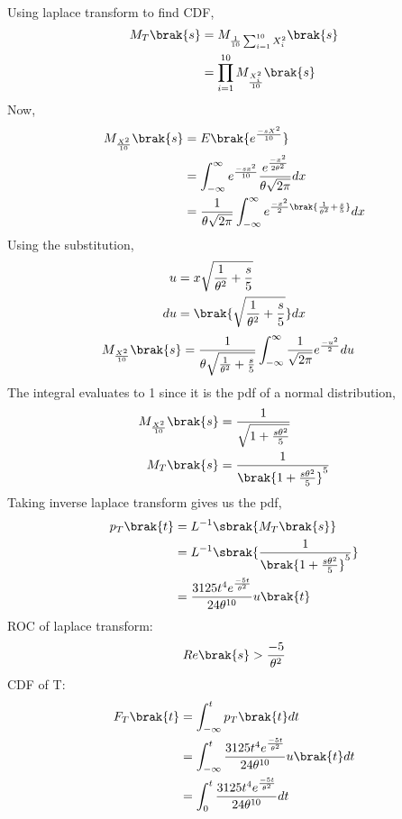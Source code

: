 \documentclass[journal,12pt,onecolumn]{IEEEtran}
\theoremstyle{remark}
\begin{document}
\\
Using laplace transform to find CDF,
\begin{align}
	M_T\brak{s} &= M_{\frac{1}{10}\sum^{10}_{i=1}{X^2_i}}\brak{s}\\
	&= \prod^{10}_{i=1}{M_{\frac{X_i^2}{10}}\brak{s}}
\end{align}
Now,
\begin{align}
	M_{\frac{X^2}{10}}\brak{s} &= E\brak{e^{\frac{-sX^2}{10}}}\\
	&= \int^{\infty}_{-\infty}{e^{\frac{-sx^2}{10}}\frac{e^{\frac{-x^2}{2\theta^2}}}{\theta\sqrt{2\pi}}dx}\\
	&= \frac{1}{\theta\sqrt{2\pi}}\int^{\infty}_{-\infty}{e^{\frac{-x^2}{2}\brak{\frac{1}{\theta^2} + \frac{s}{5}}}dx}
\end{align}
Using the substitution,
\begin{align}
	u &= x\sqrt{\frac{1}{\theta^2} + \frac{s}{5}}\\
	du &= \brak{\sqrt{\frac{1}{\theta^2} + \frac{s}{5}} }dx
\end{align}
\begin{align}
	M_{\frac{X^2}{10}}\brak{s} &= \frac{1}{\theta\sqrt{\frac{1}{\theta^2} + \frac{s}{5}}}\int^{\infty}_{-\infty}{\frac{1}{\sqrt{2\pi}}e^{\frac{-u^2}{2}}du}
\end{align}
The integral evaluates to 1 since it is the pdf of a normal distribution,
\begin{align}
	M_{\frac{X^2}{10}}\brak{s} &= \frac{1}{\sqrt{1 + \frac{s\theta^2}{5}}}\\
	M_T\brak{s} &= \frac{1}{\brak{1 + \frac{s\theta^2}{5}}^5}
\end{align}
Taking inverse laplace transform gives us the pdf,
\begin{align}
	p_T\brak{t} &= L^{-1}\sbrak{M_T\brak{s}}\\
	&= L^{-1}\sbrak{\frac{1}{\brak{1 + \frac{s\theta^2}{5}}^5}}\\
	&= \frac{3125 t^4e^{\frac{-5t}{\theta^2}}}{24 \theta^{10}}u\brak{t}
\end{align}
ROC of laplace transform:
\begin{align}
	Re\brak{s} > \frac{-5}{\theta^2}
\end{align}
CDF of T:
\begin{align}
	F_T\brak{t} &= \int^t_{-\infty}{p_T\brak{t}dt}\\
	&= \int^t_{-\infty}{\frac{3125 t^4e^{\frac{-5t}{\theta^2}}}{24 \theta^{10}}u\brak{t}dt}\\
	&= \int^t_0{\frac{3125 t^4e^{\frac{-5t}{\theta^2}}}{24 \theta^{10}}dt}
\end{align}
\end{document}
